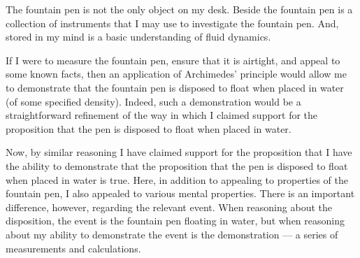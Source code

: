 \begin{note}
  The fountain pen is not the only object on my desk.
  Beside the fountain pen is a collection of instruments that I may use to investigate the fountain pen.
  And, stored in my mind is a basic understanding of fluid dynamics.

  If I were to measure the fountain pen, ensure that it is airtight, and appeal to some known facts, then an application of Archimedes' principle would allow me to demonstrate that the fountain pen is disposed to float when placed in water (of some specified density).
  Indeed, such a demonstration would be a straightforward refinement of the way in which I claimed support for the proposition that the pen is disposed to float when placed in water.

  Now, by similar reasoning I have claimed support for the proposition that I have the ability to demonstrate that the proposition that the pen is disposed to float when placed in water is true.
  Here, in addition to appealing to properties of the fountain pen, I also appealed to various mental properties.
  There is an important difference, however, regarding the relevant event.
  When reasoning about the disposition, the event is the fountain pen floating in water, but when reasoning about my ability to demonstrate the event is the demonstration --- a series of measurements and calculations.
\end{note}

